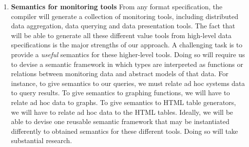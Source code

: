 \begin{enumerate}

\item {\bf Semantics for monitoring tools}  
From any format specification, the
\pads{} compiler will generate a collection of monitoring tools,
including distributed data aggregation, data querying and data
presentation tools.  The fact that \pads{} will be able to 
generate all these different value tools
from high-level data specifications is the major strengths of our 
approach.  A challenging task is to provide a {\em useful} semantics for 
these higher-level tools.  Doing so will require us to devise
a semantic framework in which types are interpreted as functions or
relations between monitoring data and abstract models of that data.  
For instance, to give semantics to our queries, we must relate
ad hoc systems data to query results.  
To give semantics to graphing functions, we will have to relate
ad hoc data to graphs.  To give semantics to HTML table generators,
we will have to relate ad hoc data to the HTML tables.  
Ideally, we will be able to devise one 
reusable semantic framework that may be instantiated differently to
obtained semantics for these different tools.  Doing so
will take substantial research.
\end{enumerate}
